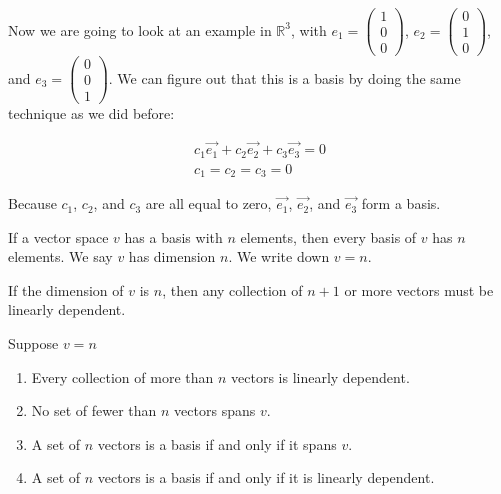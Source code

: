   \begin{problem}
    Now we are going to look at an example in $\mathbb{R}^3$, with $e_1=\left(\begin{smallmatrix}1\\0\\0\end{smallmatrix}\right)$, $e_2=\left(\begin{smallmatrix}0\\1\\0\end{smallmatrix}\right)$, and $e_3=\left(\begin{smallmatrix}0\\0\\1\end{smallmatrix}\right)$. We can figure out that this is a basis by doing the same technique as we did before:

    \begin{align*}
      c_1\vec{e_1}+c_2\vec{e_2}+c_3\vec{e_3}=0\\
      c_1=c_2=c_3=0
    \end{align*}

    Because $c_1$, $c_2$, and $c_3$ are all equal to zero, $\vec{e_1}$, $\vec{e_2}$, and $\vec{e_3}$ form a basis.
  \end{problem}

  \newpage

  \begin{theorem}
    If a vector space $v$ has a basis with $n$ elements, then every basis of $v$ has $n$ elements. We say $v$ has dimension $n$. We write down $v=n$.
  \end{theorem}

  \begin{theorem}
    If the dimension of $v$ is $n$, then any collection of $n+1$ or more vectors must be linearly dependent.
  \end{theorem}

  \begin{theorem}
    Suppose $v=n$
    
    \begin{enumerate}
      \item Every collection of more than $n$ vectors is linearly dependent.
      \item No set of fewer than $n$ vectors spans $v$.
      \item A set of $n$ vectors is a basis if and only if it spans $v$.
      \item A set of $n$ vectors is a basis if and only if it is linearly dependent.
    \end{enumerate}
  \end{theorem}

